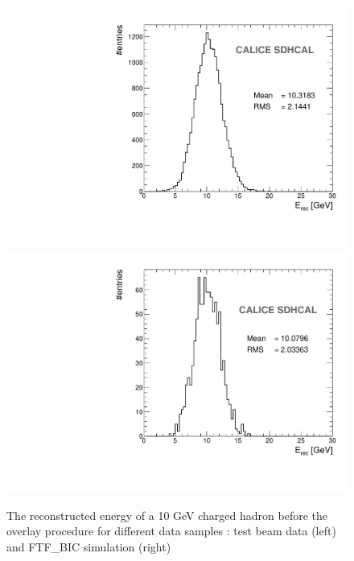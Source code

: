 \documentclass[cits]{JINST}
\begin{document}
\begin{figure}[!h]
  \begin{center}
    \includegraphics[width=0.45\linewidth]{plots/OverlayEvent/OverlayEvent_OverlayCheck_ChBefore_TB.pdf}
    \includegraphics[width=0.45\linewidth]{plots/OverlayEvent/OverlayEvent_OverlayCheck_ChBefore_FTF_BIC.pdf}
  \end{center}
  \caption{\label{OVERLAY_EVENT_MC_CH_EREC_NO_OVERLAY} The reconstructed energy of a 10 GeV charged hadron before the overlay procedure for different data samples : test beam data (left) and FTF\_BIC simulation (right)}
\end{figure}
\end{document}
